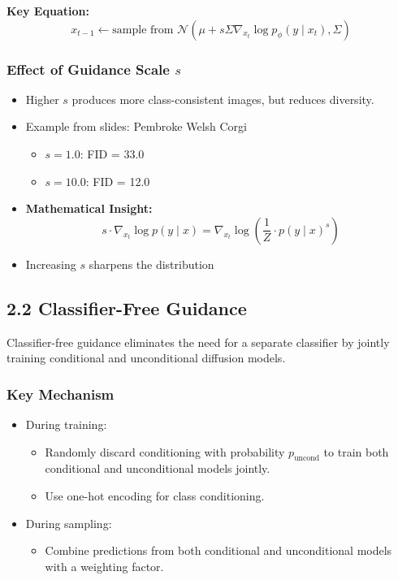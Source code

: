 \textbf{Key Equation:}
\[
x_{t-1} \leftarrow \text{sample from } \mathcal{N}(\mu + s \Sigma \nabla_{x_t} \log p_\phi(y \mid x_t), \Sigma)
\]

\subsubsection*{Effect of Guidance Scale $s$}
\begin{itemize}
    \item Higher $s$ produces more class-consistent images, but reduces diversity.
    \item Example from slides: Pembroke Welsh Corgi
    \begin{itemize}
        \item $s = 1.0$: FID = 33.0
        \item $s = 10.0$: FID = 12.0
    \end{itemize}
    \item \textbf{Mathematical Insight:}
    \[
    s \cdot \nabla_{x_t} \log p(y \mid x) = \nabla_{x_t} \log \left( \frac{1}{Z} \cdot p(y \mid x)^s \right)
    \]
    \item Increasing $s$ sharpens the distribution
\end{itemize}

\subsection{2.2 Classifier-Free Guidance}

Classifier-free guidance eliminates the need for a separate classifier by jointly training conditional and unconditional diffusion models.

\subsubsection*{Key Mechanism}
\begin{itemize}
    \item During training:
    \begin{itemize}
        \item Randomly discard conditioning with probability $p_{\text{uncond}}$ to train both conditional and unconditional models jointly.
        \item Use one-hot encoding for class conditioning.
    \end{itemize}
    \item During sampling:
    \begin{itemize}
        \item Combine predictions from both conditional and unconditional models with a weighting factor.
    \end{itemize}
\end{itemize}

